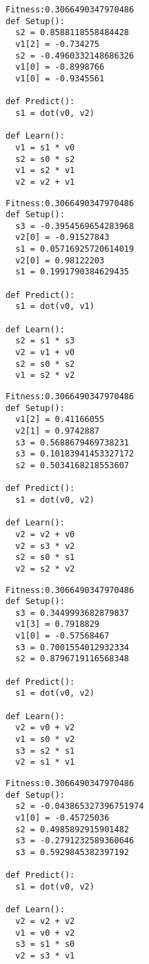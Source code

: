\documentclass[twocolumn, a4j]{jarticle}
\begin{document}
\begin{lstlisting}[caption= No. 0.16]
Fitness:0.3066490347970486 
def Setup():
  s2 = 0.8588118558484428
  v1[2] = -0.734275
  s2 = -0.4960332148686326
  v1[0] = -0.8998766
  v1[0] = -0.9345561

def Predict():
  s1 = dot(v0, v2)

def Learn():
  v1 = s1 * v0
  s2 = s0 * s2
  v1 = s2 * v1
  v2 = v2 + v1

\end{lstlisting}

\newpage

\begin{lstlisting}[caption= No. 0.17]
Fitness:0.3066490347970486 
def Setup():
  s3 = -0.3954569654283968
  v2[0] = -0.91527843
  s1 = 0.05716925720614019
  v2[0] = 0.98122203
  s1 = 0.1991790384629435

def Predict():
  s1 = dot(v0, v1)

def Learn():
  s2 = s1 * s3
  v2 = v1 + v0
  s2 = s0 * s2
  v1 = s2 * v2

\end{lstlisting}

\begin{lstlisting}[caption= No. 0.18]
Fitness:0.3066490347970486 
def Setup():
  v1[2] = 0.41166055
  v2[1] = 0.9742887
  s3 = 0.5688679469738231
  s3 = 0.10183941453327172
  s2 = 0.5034168218553607

def Predict():
  s1 = dot(v0, v2)

def Learn():
  v2 = v2 + v0
  v2 = s3 * v2
  s2 = s0 * s1
  v2 = s2 * v2

\end{lstlisting}

\newpage

\begin{lstlisting}[caption= No. 0.19]
Fitness:0.3066490347970486 
def Setup():
  s3 = 0.3449993682879837
  v1[3] = 0.7918829
  v1[0] = -0.57568467
  s3 = 0.7001554012932334
  s2 = 0.8796719116568348

def Predict():
  s1 = dot(v0, v2)

def Learn():
  v2 = v0 + v2
  v1 = s0 * v2
  s3 = s2 * s1
  v2 = s1 * v1

\end{lstlisting}

\begin{lstlisting}[caption= No. 0.20]
Fitness:0.3066490347970486 
def Setup():
  s2 = -0.043865327396751974
  v1[0] = -0.45725036
  s2 = 0.4985892915901482
  s3 = -0.2791232589360646
  s3 = 0.5929845382397192

def Predict():
  s1 = dot(v0, v2)

def Learn():
  v2 = v2 + v2
  v1 = v0 + v2
  s3 = s1 * s0
  v2 = s3 * v1

\end{lstlisting}
\end{document}
